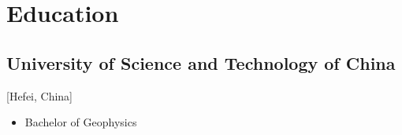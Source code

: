 \documentclass{mycv}
\begin{document}
%
%
%

\section{Education}


\subsection{University of Science and Technology of China}[Hefei, China]
\vspace{-\parskip}%
\begin{itemize}[label={}]
  \item Bachelor of Geophysics 
\end{itemize}
\end{document}
